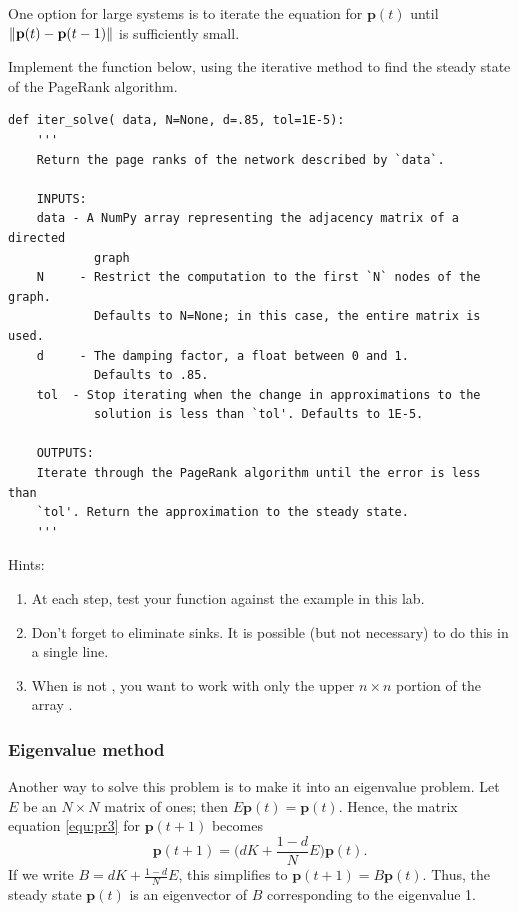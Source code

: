 One option for large systems is to iterate the equation for $\mathbf{p}(t)$ until $\left\lVert\mathbf{p}(t)-\mathbf{p}(t-1)\right\rVert$ is sufficiently small.


\begin{problem}
\label{prob:pagerank_dense_iter}
Implement the function below, using the iterative method to find the steady state of the PageRank algorithm.
\begin{lstlisting}
def iter_solve( data, N=None, d=.85, tol=1E-5):
    '''
    Return the page ranks of the network described by `data`.
    
    INPUTS:
    data - A NumPy array representing the adjacency matrix of a directed 
            graph
    N     - Restrict the computation to the first `N` nodes of the graph. 
            Defaults to N=None; in this case, the entire matrix is used.
    d     - The damping factor, a float between 0 and 1. 
            Defaults to .85.
    tol  - Stop iterating when the change in approximations to the 
            solution is less than `tol'. Defaults to 1E-5.
    
    OUTPUTS:
    Iterate through the PageRank algorithm until the error is less than 
    `tol'. Return the approximation to the steady state.
    '''
\end{lstlisting}
Hints:
\begin{enumerate}
\item At each step, test your function against the example in this lab.
\item Don't forget to eliminate sinks. 
It is possible (but not necessary) to do this in a single line.
\item When  is not , you want to work with only the upper $n \times n$ portion of the array .
\end{enumerate}
\end{problem}

\subsubsection*{Eigenvalue method}
Another way to solve this problem is to make it into an eigenvalue problem. 
Let $E$ be an $N \times N$ matrix of ones; then $E\mathbf{p}(t) = \mathbf{p}(t)$. 
Hence, the matrix equation \eqref{equ:pr3} for $\mathbf{p}(t+1)$ becomes
\[\mathbf{p}(t+1) = \Big(dK + \frac{1-d}{N}E\Big)\mathbf{p}(t).\]
If we write $B = dK + \frac{1-d}{N}E$, this simplifies to $\mathbf{p}(t+1) = B\mathbf{p}(t).$
Thus, the steady state $\mathbf{p}(t)$ is an eigenvector of $B$ corresponding to the eigenvalue 1.

